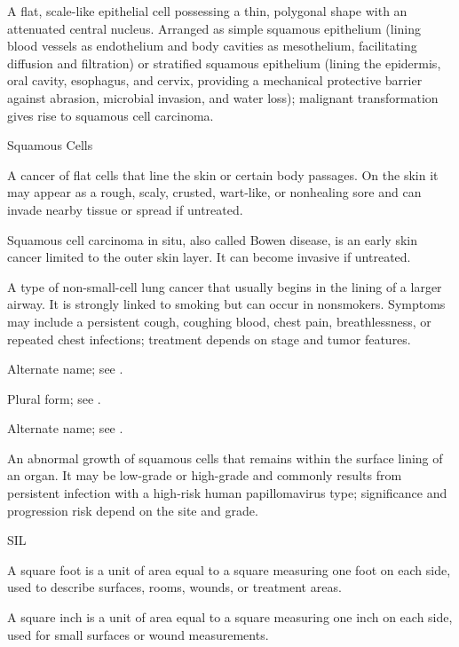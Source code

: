  A flat, scale-like epithelial cell possessing a thin, polygonal shape with an attenuated central nucleus. Arranged as simple squamous epithelium (lining blood vessels as endothelium and body cavities as mesothelium, facilitating diffusion and filtration) or stratified squamous epithelium (lining the epidermis, oral cavity, esophagus, and cervix, providing a mechanical protective barrier against abrasion, microbial invasion, and water loss); malignant transformation gives rise to squamous cell carcinoma.

\synonyms
Squamous Cells

 A cancer of flat cells that line the skin or certain body passages. On the skin it may appear as a rough, scaly, crusted, wart-like, or nonhealing sore and can invade nearby tissue or spread if untreated.

 Squamous cell carcinoma in situ, also called Bowen disease, is an early skin cancer limited to the outer skin layer. It can become invasive if untreated.

 A type of non-small-cell lung cancer that usually begins in the lining of a larger airway. It is strongly linked to smoking but can occur in nonsmokers. Symptoms may include a persistent cough, coughing blood, chest pain, breathlessness, or repeated chest infections; treatment depends on stage and tumor features.

 Alternate name; see .

 Plural form; see .

 Alternate name; see .

 An abnormal growth of squamous cells that remains within the surface lining of an organ. It may be low-grade or high-grade and commonly results from persistent infection with a high-risk human papillomavirus type; significance and progression risk depend on the site and grade.

\synonyms
SIL

 A square foot is a unit of area equal to a square measuring one foot on each side, used to describe surfaces, rooms, wounds, or treatment areas.

 A square inch is a unit of area equal to a square measuring one inch on each side, used for small surfaces or wound measurements.

